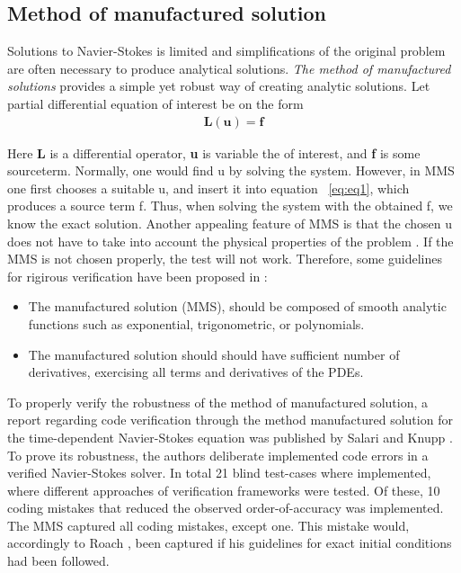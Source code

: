 \subsection{Method of manufactured solution}
Solutions to Navier-Stokes is limited and simplifications of the original problem are often necessary to produce analytical solutions. \textit{The method of manufactured solutions} provides a simple yet robust way of creating analytic solutions. Let partial differential equation of interest be on the form
\begin{align*}
\textbf{L}(\textbf{u}) = \textbf{f}
\label{eq:eq1}
\end{align*}

Here \textbf{L} is a differential operator, \textbf{u} is variable the of interest, and \textbf{f} is some sourceterm. Normally, one would find u by solving the system. However, in MMS one first chooses a suitable u, and insert it into equation ~\ref{eq:eq1}, which produces a source term f. Thus, when solving the system with the obtained f, we know the exact solution. Another appealing feature of MMS is that the chosen u does not have to take into account the physical properties of the problem \cite{Roache2002}. 
\newpage
If the MMS is not chosen properly, the test will not work. Therefore, some guidelines for rigirous verification have been proposed in \cite{Etienne2006, Biggs, Roache2002}:

\begin{itemize}
\item The manufactured solution (MMS), should be composed of smooth analytic functions such as exponential, trigonometric, or polynomials.
\item The manufactured solution should should have sufficient number of derivatives, exercising all terms and derivatives of the PDEs. 
\end{itemize}

To properly verify the robustness of the method of manufactured solution, a report regarding code verification through the method manufactured solution for the time-dependent Navier-Stokes equation was published by Salari and Knupp \cite{Biggs}.  To prove its robustness, the authors deliberate implemented  code errors in a verified Navier-Stokes solver. In total 21 blind test-cases where implemented, where different approaches of verification frameworks were tested.  Of these, 10 coding mistakes that reduced the observed order-of-accuracy was implemented. The MMS captured all coding mistakes, except one. This mistake would, accordingly to Roach \cite{Biggs}, been captured if his guidelines for exact initial conditions had been followed. \\

